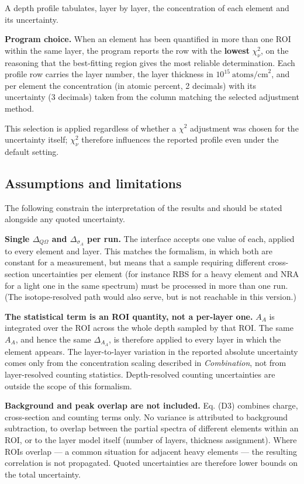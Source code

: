 A depth profile tabulates, layer by layer, the concentration of each
element and its uncertainty.

\textbf{Program choice.} When an element has been quantified in more
than one ROI within the same layer, the program reports the row with the
\textbf{lowest} \(\chi^2_\nu\), on the reasoning that the best-fitting
region gives the most reliable determination. Each profile row carries
the layer number, the layer thickness in \(10^{15}\ \text{atoms/cm}^2\),
and per element the concentration (in atomic percent, 2 decimals) with
its uncertainty (3 decimals) taken from the column matching the selected
adjustment method.

This selection is applied regardless of whether a \(\chi^2\) adjustment
was chosen for the uncertainty itself; \(\chi^2_\nu\) therefore
influences the reported profile even under the default setting.

\subsection{Assumptions and
limitations}\label{assumptions-and-limitations}

The following constrain the interpretation of the results and should be
stated alongside any quoted uncertainty.

\textbf{Single \(\Delta_{Q\Omega}\) and \(\Delta_{\sigma_A}\) per run.}
The interface accepts one value of each, applied to every element and
layer. This matches the formalism, in which both are constant for a
measurement, but means that a sample requiring different cross-section
uncertainties per element (for instance RBS for a heavy element and NRA
for a light one in the same spectrum) must be processed in more than one
run. (The isotope-resolved path would also serve, but is not reachable
in this version.)

\textbf{The statistical term is an ROI quantity, not a per-layer one.}
\(A_A\) is integrated over the ROI across the whole depth sampled by
that ROI. The same \(A_A\), and hence the same \(\Delta_{A_A}\), is
therefore applied to every layer in which the element appears. The
layer-to-layer variation in the reported absolute uncertainty comes only
from the concentration scaling described in \emph{Combination}, not from
layer-resolved counting statistics. Depth-resolved counting
uncertainties are outside the scope of this formalism.

\textbf{Background and peak overlap are not included.} Eq. (D3) combines
charge, cross-section and counting terms only. No variance is attributed
to background subtraction, to overlap between the partial spectra of
different elements within an ROI, or to the layer model itself (number
of layers, thickness assignment). Where ROIs overlap --- a common
situation for adjacent heavy elements --- the resulting correlation is
not propagated. Quoted uncertainties are therefore lower bounds on the
total uncertainty.

